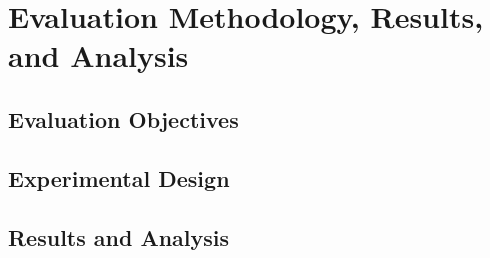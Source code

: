 ﻿\chapter{Evaluation Methodology, Results, and Analysis}
\label{ch:eval}

\section{Evaluation Objectives}
\label{sec:eval_objective}


\section{Experimental Design}
\label{sec:eval_configs}


\section{Results and Analysis}
\label{sec:results}

